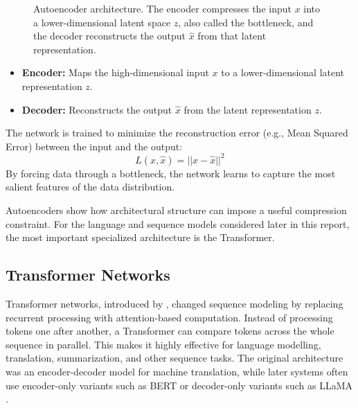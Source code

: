 \begin{figure}[htbp]
    \caption[Autoencoder architecture]{Autoencoder architecture. The encoder compresses the input $x$ into a lower-dimensional latent space $z$, also called the bottleneck, and the decoder reconstructs the output $\hat{x}$ from that latent representation.}
    \label{fig:autoencoder}
\end{figure}

\begin{itemize}
    \item \textbf{Encoder:} Maps the high-dimensional input $x$ to a lower-dimensional latent representation $z$.
    \item \textbf{Decoder:} Reconstructs the output $\hat{x}$ from the latent representation $z$.
\end{itemize}

The network is trained to minimize the reconstruction error (e.g., Mean Squared Error) between the input and the output:
\[
L(x, \hat{x}) = || x - \hat{x} ||^2
\]
By forcing data through a bottleneck, the network learns to capture the most salient features of the data distribution.

Autoencoders show how architectural structure can impose a useful compression constraint.
For the language and sequence models considered later in this report, the most important specialized architecture is the Transformer.




\subsection{Transformer Networks}

Transformer networks, introduced by \cite{vaswani2017attention}, changed sequence modeling by replacing recurrent processing with attention-based computation. Instead of processing tokens one after another, a Transformer can compare tokens across the whole sequence in parallel. This makes it highly effective for language modelling, translation, summarization, and other sequence tasks. The original architecture was an encoder-decoder model for machine translation, while later systems often use encoder-only variants such as BERT \cite{devlin2019bert} or decoder-only variants such as LLaMA \cite{touvron2023llama2}.

